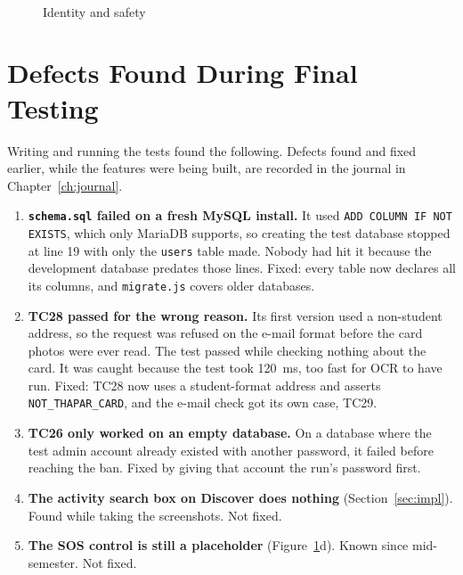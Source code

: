 \begin{figure}[p]
\centering
{}\hfill
{}\hfill
{}\\[10pt]
\caption{Identity and safety}
\label{fig:scr-safety}
\end{figure}

\clearpage
\section{Defects Found During Final Testing}

Writing and running the tests found the following. Defects found and fixed earlier, while
the features were being built, are recorded in the journal in Chapter~\ref{ch:journal}.

\begin{enumerate}
  \item \textbf{\texttt{schema.sql} failed on a fresh MySQL install.} It used
        \texttt{ADD COLUMN IF NOT EXISTS}, which only MariaDB supports, so creating the
        test database stopped at line 19 with only the \texttt{users} table made. Nobody
        had hit it because the development database predates those lines. Fixed: every
        table now declares all its columns, and \texttt{migrate.js} covers older databases.
  \item \textbf{TC28 passed for the wrong reason.} Its first version used a non-student
        address, so the request was refused on the e-mail format before the card photos
        were ever read. The test passed while checking nothing about the card. It was
        caught because the test took 120~ms, too fast for OCR to have run. Fixed: TC28 now
        uses a student-format address and asserts \texttt{NOT\_THAPAR\_CARD}, and the
        e-mail check got its own case, TC29.
  \item \textbf{TC26 only worked on an empty database.} On a database where the test admin
        account already existed with another password, it failed before reaching the ban.
        Fixed by giving that account the run's password first.
  \item \textbf{The activity search box on Discover does nothing} (Section~\ref{sec:impl}).
        Found while taking the screenshots. Not fixed.
  \item \textbf{The SOS control is still a placeholder} (Figure~\ref{fig:scr-safety}d). Known
        since mid-semester. Not fixed.
\end{enumerate}
